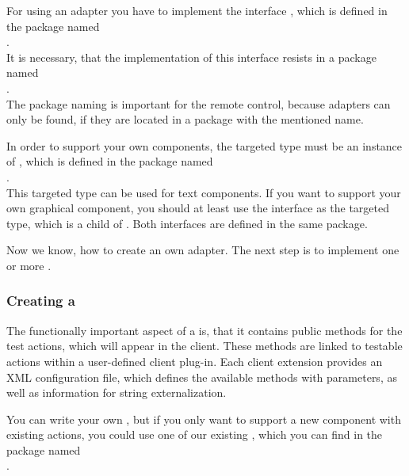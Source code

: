 For using an adapter you have to implement the interface
, which is defined in the package named\\
.\\
It is necessary, that the implementation of this interface resists in a package
named\\
.\\
The package naming is important for the \app{} remote control, because adapters
can only be found, if they are located in a package with the mentioned name.

In order to support your own components, the targeted type must be an instance
of , which is defined in the package named\\
.\\
This targeted type can be used for text components. If you want to support your
own graphical component, you should at least use the interface
 as the targeted type, which is a child of
. Both interfaces are defined in the same package.

Now we know, how to create an own adapter. The next step is to implement one
or more \gdtesterclass.

\subsubsection{Creating a \gdtesterclass}

The functionally important aspect of a \gdtesterclass is, that it
contains public methods for the \app{} test actions, which will appear in
the client. These methods are linked to testable actions within a user-defined
\app{} client plug-in. Each \app{} client extension provides an XML
configuration file, which defines the available methods with parameters, as well as
information for string externalization.

You can write your own \gdtesterclasses, but if you only want to support a new
component with existing actions, you could use one of our existing
\gdtesterclasses, which you can find in the package named\\
.

